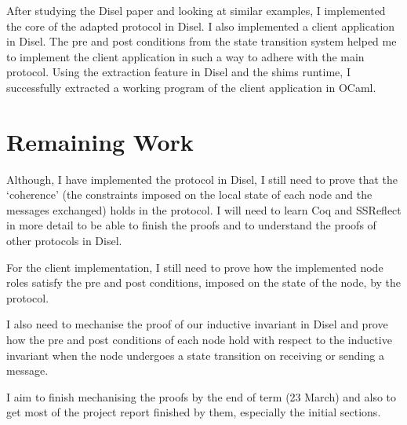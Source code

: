 After studying the Disel paper and looking at similar examples, I implemented the core of the adapted protocol in Disel. I also implemented a client application in Disel. The pre and post conditions from the state transition system helped me to implement the client application in such a way to adhere with the main protocol. Using the extraction feature in Disel and the shims runtime, I successfully extracted a working program of the client application in OCaml.

\section{Remaining Work}
Although, I have implemented the protocol in Disel, I still need to prove that the ‘coherence’ (the constraints imposed on the local state of each node and the messages exchanged) holds in the protocol. I will need to learn Coq and SSReflect in more detail to be able to finish the proofs and to understand the proofs of other protocols in Disel.

For the client implementation, I still need to prove how the implemented node roles satisfy the pre and post conditions, imposed on the state of the node, by the protocol.

I also need to mechanise the proof of our inductive invariant in Disel and prove how the pre and post conditions of each node hold with respect to the inductive invariant when the node undergoes a state transition on receiving or sending a message.

I aim to finish mechanising the proofs by the end of term (23 March) and also to get most of the project report finished by them, especially the initial sections.
